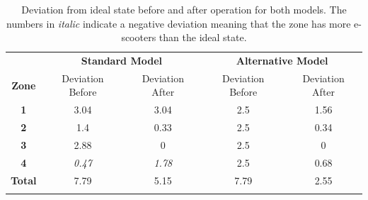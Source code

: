 \begin{table}[H]
    \centering
    \caption{Deviation from ideal state before and after operation for both models. The numbers in \textit{italic} indicate a negative deviation meaning that the zone has more e-scooters than the ideal state.}
    \begin{tabular}{c | c c | c c}
        \thickhline
         \multicolumn{1}{c}{} & \multicolumn{2}{c}{\textbf{Standard Model}} \vline & \multicolumn{2}{c}{\textbf{Alternative Model}}\\
        \thickhline
        \textbf{Zone} & Deviation Before & Deviation After & Deviation Before & Deviation After  \\
        \hline
        \textbf{1} & 3.04 & 3.04 & 2.5 & 1.56  \\
        \textbf{2} & 1.4 & 0.33 & 2.5 & 0.34  \\
        \textbf{3} & 2.88 & 0 & 2.5 & 0  \\
        \textbf{4} & \textit{0.47} & \textit{1.78} & 2.5 & 0.68  \\
        \hline
        \textbf{Total} & 7.79 & 5.15 & 7.79 & 2.55 \\
        \thickhline
    \end{tabular}
    \label{tab:solution comparison data}
\end{table}
